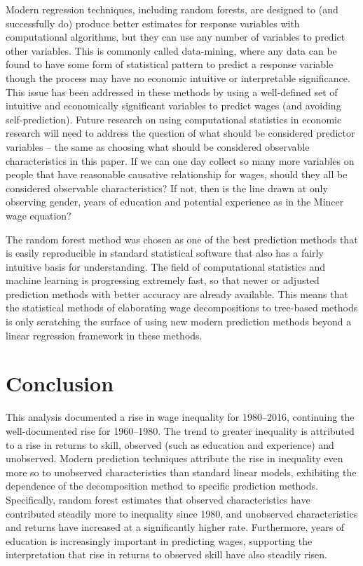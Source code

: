 \documentclass[notitlepage,12pt]{article}
\begin{document}
Modern regression techniques, including random forests, are designed to (and successfully do) produce better estimates for response variables with computational algorithms, but they can use any number of variables to predict other variables.  This is commonly called data-mining, where any data can be found to have some form of statistical pattern to predict a response variable though the process may have no economic intuitive or interpretable significance.  This issue has been addressed in these methods by using a well-defined set of intuitive and economically significant variables to predict wages (and avoiding self-prediction).  Future research on using computational statistics in economic research will need to address the question of what should be considered predictor variables -- the same as choosing what should be considered observable characteristics in this paper.  If we can one day collect so many more variables on people that have reasonable causative relationship for wages, should they all be considered observable characteristics?  If not, then is the line drawn at only observing gender, years of education and potential experience as in the Mincer wage equation?

The random forest method was chosen as one of the best prediction methods that is easily reproducible in standard statistical software that also has a fairly intuitive basis for understanding.  The field of computational statistics and machine learning is progressing extremely fast, so that newer or adjusted prediction methods with better accuracy are already available.  This means that the statistical methods of elaborating wage decompositions to tree-based methods is only scratching the surface of using new modern prediction methods beyond a linear regression framework in these methods.

\section{Conclusion}
This analysis documented a rise in wage inequality for 1980--2016, continuing the well-documented rise for 1960--1980.  The trend to greater inequality is attributed to a rise in returns to skill, observed (such as education and experience) and unobserved.  Modern prediction techniques attribute the rise in inequality even more so to unobserved characteristics than standard linear models, exhibiting the dependence of the \cite{juhn1993wage} decomposition method to specific prediction methods.  Specifically, random forest estimates that observed characteristics have contributed steadily more to inequality since 1980, and unobserved characteristics and returns have increased at a significantly higher rate.  Furthermore, years of education is increasingly important in predicting wages, supporting the interpretation that rise in returns to observed skill have also steadily risen.
\end{document}
